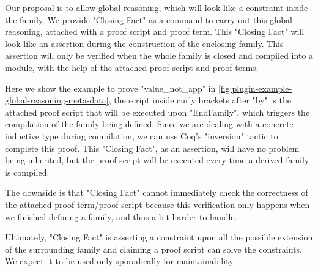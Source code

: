 Our proposal is to allow global reasoning, which will look like a
constraint inside the family. We provide "Closing Fact" as a command to
carry out this global reasoning, attached with a proof script and proof
term. This "Closing Fact" will look like an assertion during the
construction of the enclosing family. This assertion will only be
verified when the whole family is closed and compiled into a module,
with the help of the attached proof script and proof terms.

Here we show the example to prove "value_not_app" in
\cref{fig:plugin-example-global-reasoning-meta-data}, the script inside
curly brackets after "by" is the attached proof script that will be
executed upon "EndFamily", which triggers the compilation of the family
being defined.
Since we are dealing with a concrete inductive type during compilation,
we can use Coq's "inversion" tactic to complete this proof.
This "Closing Fact", as an assertion, will have no problem being
inherited, but the proof script will be executed every time a derived
family is compiled.

The downside is that "Closing Fact" cannot immediately check the correctness of the
attached proof term/proof script because this verification only happens when we
finished defining a family, and thus a bit harder to handle.

Ultimately, "Closing Fact" is asserting a constraint upon all the
possible extension of the surrounding family and claiming a proof script
can solve the constraints.
We expect it to be used only sporadically for maintainability.




